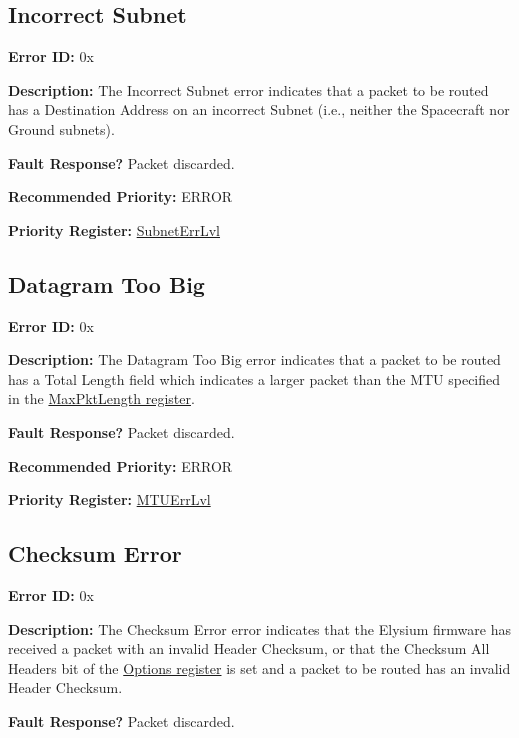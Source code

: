 \documentclass{hitec}
\newcounter{idval}
\newcommand*{\elyid}[0]{0x\padzeroes[2]\Hexadecimal{idval}\addtocounter{idval}{1}}
\newcommand{\stoptocentries}{\renewcommand{\addcontentsline}[3]{}}
\begin{document}
\stoptocentries

\subsection{Incorrect Subnet}
\label{err:slipsubnet}

\noindent \textbf{Error ID:} \elyid 

\noindent \textbf{Description:} The Incorrect Subnet error indicates that a
packet to be routed has a Destination Address on an incorrect Subnet (i.e.,
neither the Spacecraft nor Ground subnets).

\noindent \textbf{Fault Response?} Packet discarded.

\noindent \textbf{Recommended Priority:} ERROR 

\noindent \textbf{Priority Register:} \hyperref[reg:subneterrlvl]{SubnetErrLvl}

\subsection{Datagram Too Big}
\label{err:slipmtu}

\noindent \textbf{Error ID:} \elyid 

\noindent \textbf{Description:} The Datagram Too Big error indicates that a
packet to be routed has a Total Length field which indicates a larger packet
than the MTU specified in the \hyperref[reg:maxpktlength]{MaxPktLength
register}.

\noindent \textbf{Fault Response?} Packet discarded.

\noindent \textbf{Recommended Priority:} ERROR 

\noindent \textbf{Priority Register:} \hyperref[reg:mtuerrlvl]{MTUErrLvl}

\subsection{Checksum Error}
\label{err:slipchecksum}

\noindent \textbf{Error ID:} \elyid 

\noindent \textbf{Description:} The Checksum Error error indicates that the
Elysium firmware has received a packet with an invalid Header Checksum, or that
the Checksum All Headers bit of the \hyperref[reg:slipoptions]{Options
register} is set and a packet to be routed has an invalid Header Checksum.

\noindent \textbf{Fault Response?} Packet discarded.
\end{document}
